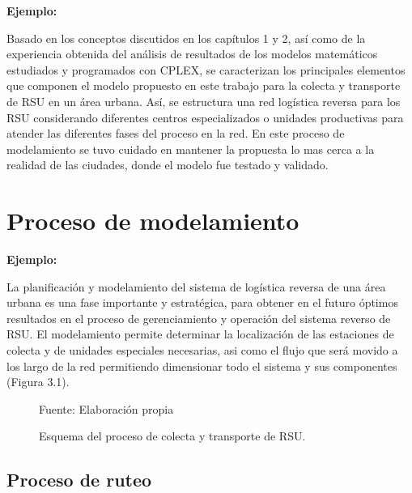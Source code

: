 {\bf Ejemplo:}\par

Basado en los conceptos discutidos en los capítulos 1 y 2, así como de la experiencia obtenida del análisis de resultados de los modelos matemáticos estudiados y programados con CPLEX, se caracterizan los principales elementos que componen el modelo propuesto en este trabajo para la colecta y transporte de RSU en un área urbana. Así, se estructura una red logística reversa para los RSU considerando diferentes centros especializados o unidades  productivas para atender las diferentes fases del proceso en la red. En este proceso de modelamiento se tuvo cuidado en mantener la propuesta lo mas cerca a la realidad de las ciudades, donde el modelo fue testado y validado.

\section{Proceso de modelamiento} 

{\bf Ejemplo:}\par

La planificación y modelamiento del sistema de logística reversa de una área urbana es una fase importante y estratégica, para obtener en el futuro óptimos resultados en el proceso de gerenciamiento y operación del sistema reverso de RSU. El modelamiento permite determinar la localización de las estaciones de colecta y de unidades especiales necesarias, asi como el flujo que será movido a los largo de la red permitiendo dimensionar todo el sistema y sus componentes (Figura 3.1).
\vskip 0.3cm
\begin{figure}[ht]
\begin{center}
\end{center}
\begin{center}
\vskip -0.5cm
\caption{\small{Esquema del proceso de colecta y transporte de RSU.}}
{\small{Fuente: Elaboración propia}}
\end{center}
\end{figure}

\subsection{Proceso de ruteo}


